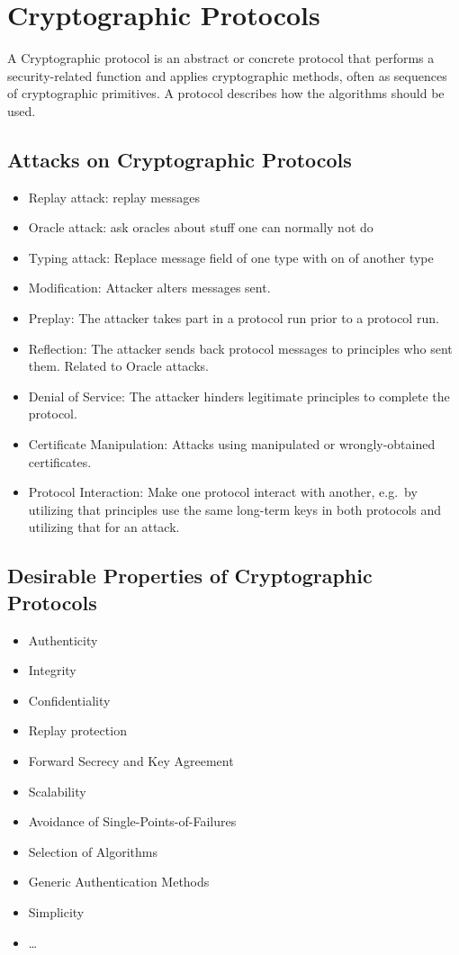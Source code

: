 
\section{Cryptographic Protocols}
A Cryptographic protocol is an abstract or concrete protocol that performs a security-related function and applies cryptographic methods, often as sequences of cryptographic primitives.
A protocol describes how the algorithms should be used. 

\subsection{Attacks on Cryptographic Protocols}
\begin{itemize}[noitemsep, topsep=0pt]
  \item Replay attack: replay messages
  \item Oracle attack: ask oracles about stuff one can normally not do
  \item Typing attack: Replace message field of one type with on of another type
  \item Modification: Attacker alters messages sent.
  \item Preplay: The attacker takes part in a protocol run prior to a protocol run.
  \item Reflection: The attacker sends back protocol messages to principles who sent them. Related to Oracle attacks.
  \item Denial of Service: The attacker hinders legitimate principles to complete the protocol.
  \item Certificate Manipulation: Attacks using manipulated or wrongly-obtained certificates.
  \item Protocol Interaction: Make one protocol interact with another, e.g.\ by utilizing that principles use the same long-term keys in both protocols and utilizing that for an attack.
\end{itemize}

\subsection{Desirable Properties of Cryptographic Protocols}
\begin{itemize}[noitemsep, topsep=0pt]
  \item Authenticity
  \item Integrity
  \item Confidentiality
  \item Replay protection
  \item Forward Secrecy and Key Agreement
  \item Scalability
  \item Avoidance of Single-Points-of-Failures
  \item Selection of Algorithms
  \item Generic Authentication Methods
  \item Simplicity
  \item \dots
\end{itemize}


